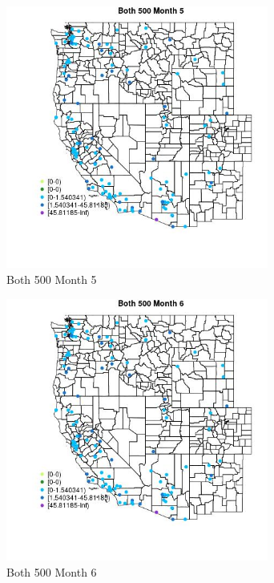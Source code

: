 \begin{figure} 
\centering  
\includegraphics[width=0.77\textwidth]{Code_Outputs/Report_ML_input_PM25_Step4_part_e_de_duplicated_aves_MapObsMo5Both_500.jpg} 
\caption{\label{fig:Report_ML_input_PM25_Step4_part_e_de_duplicated_avesMapObsMo5Both_500}Both 500 Month 5} 
\end{figure} 
 

\begin{figure} 
\centering  
\includegraphics[width=0.77\textwidth]{Code_Outputs/Report_ML_input_PM25_Step4_part_e_de_duplicated_aves_MapObsMo6Both_500.jpg} 
\caption{\label{fig:Report_ML_input_PM25_Step4_part_e_de_duplicated_avesMapObsMo6Both_500}Both 500 Month 6} 
\end{figure} 
 

